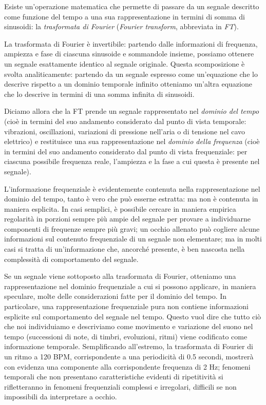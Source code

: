 \documentclass[11pt]{report}
\begin{document}
Esiste un'operazione matematica che permette di passare da un segnale descritto come funzione del tempo a una sua rappresentazione in termini di somma di sinusoidi: la \emph{trasformata di Fourier} (\emph{Fourier transform}, abbreviata in \emph{FT}).

La trasformata di Fourier è invertibile: partendo dalle informazioni di frequenza, ampiezza e fase di ciascuna sinusoide e sommandole insieme, possiamo ottenere un segnale esattamente identico al segnale originale. Questa scomposizione è svolta analiticamente: partendo da un segnale espresso come un'equazione che lo descrive rispetto a un dominio temporale infinito otteniamo un'altra equazione che lo descrive in termini di una somma infinita di sinusoidi.%

Diciamo allora che la FT prende un segnale rappresentato nel \emph{dominio del tempo} (cioè in termini del suo andamento considerato dal punto di vista temporale: vibrazioni, oscillazioni, variazioni di pressione nell'aria o di tensione nel cavo elettrico) e restituisce una sua rappresentazione nel \emph{dominio della frequenza} (cioè in termini del suo andamento considerato dal punto di vista frequenziale: per ciascuna possibile frequenza reale, l'ampiezza e la fase a cui questa è presente nel segnale).

L'informazione frequenziale è evidentemente contenuta nella rappresentazione nel dominio del tempo, tanto è vero che può esserne estratta: ma non è contenuta in maniera esplicita. In casi semplici, è possibile cercare in maniera empirica regolarità in porzioni sempre più ampie del segnale per provare a individuarne componenti di frequenze sempre più gravi; un occhio allenato può cogliere alcune informazioni sul contenuto frequenziale di un segnale non elementare; ma in molti casi si tratta di un'informazione che, ancorché presente, è ben nascosta nella complessità di comportamento del segnale.

Se un segnale viene sottoposto alla trasformata di Fourier, otteniamo una rappresentazione nel dominio frequenziale a cui si possono applicare, in maniera speculare, molte delle considerazioni fatte per il dominio del tempo. In particolare, una rappresentazione frequenziale pura non contiene informazioni esplicite sul comportamento del segnale nel tempo. Questo vuol dire che tutto ciò che noi individuiamo e descriviamo come movimento e variazione del suono nel tempo (successioni di note, di timbri, evoluzioni, ritmi) viene codificato come informazione temporale. Semplificando all'estremo, la trasformata di Fourier di un ritmo a 120 BPM, corrispondente a una periodicità di 0.5 secondi, mostrerà con evidenza una componente alla corrispondente frequenza di 2 Hz; fenomeni temporali che non presentano caratteristiche evidenti di ripetitività si rifletteranno in fenomeni frequenziali complessi e irregolari, difficili se non impossibili da interpretare a occhio. 
\end{document}
